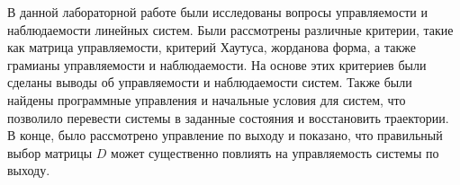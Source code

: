 В данной лабораторной работе были исследованы вопросы управляемости 
и наблюдаемости линейных систем. Были рассмотрены различные критерии, 
такие как матрица управляемости, критерий Хаутуса, жорданова форма, 
а также грамианы управляемости и наблюдаемости. На основе этих критериев 
были сделаны выводы об управляемости и наблюдаемости систем. 
Также были найдены программные управления и начальные условия для систем, 
что позволило перевести системы в заданные состояния и восстановить 
траектории. В конце, было рассмотрено управление по выходу и показано, 
что правильный выбор матрицы $D$ может существенно повлиять 
на управляемость системы по выходу.